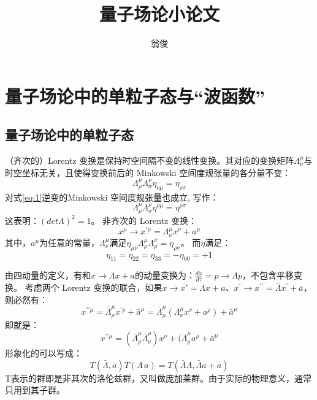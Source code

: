 \documentclass[10pt,a4paper]{article}
\author{翁俊}
\title{量子场论小论文}
\begin{document}
\maketitle
\newpage
\tableofcontents
\newpage

\section{量子场论中的单粒子态与“波函数”}
\label{sec:1}
\subsection{量子场论中的单粒子态}
\label{sec:1.1}
（齐次的）Lorentz 变换是保持时空间隔不变的线性变换。\cite{wenboge}\cite{peskin}其对应的变换矩阵$\Lambda_{\nu}^{\mu}$与时空坐标无关，且使得变换前后的 Minkowski 空间度规张量的各分量不变： 
\begin{equation}
\label{eq:1}
\Lambda_{\rho}^{\mu}\Lambda_{\sigma}^{\nu} \eta_{\nu\mu}=\eta_{\rho\sigma}
\end{equation}
对式\eqref{eq:1}逆变的Minkowski 空间度规张量也成立, 写作：
\begin{equation}
\label{eq:2}
\Lambda_{\rho}^{ \mu}\Lambda_{\sigma}^{\nu} \eta^{\nu\mu}=\eta^{\rho\sigma}
\end{equation}
这表明：$(det\Lambda)^2=1$。
非齐次的 Lorentz 变换：
\begin{equation}
\label{eq:3}
x^{\mu}\rightarrow x^{\prime \mu}=\Lambda_{\nu}^{\mu}x^{\nu}+a^{\mu}
\end{equation}
其中，$a^{\mu}$为任意的常量，$\Lambda_{\nu}^{\mu}$满足$\eta_{\mu\nu}\Lambda_{\rho}^{\mu}\Lambda_{\rho}^{\sigma}=\eta_{\rho\sigma}$。
而$\eta$满足：
\begin{equation}
\label{eq:301}
\eta_{11}=\eta_{22}=\eta_{33}=-\eta_{00}=+1
\end{equation}

由四动量的定义，有和$x\rightarrow \Lambda x+a$的动量变换为：$\frac{dx}{d\tau}=p\rightarrow\Lambda p$，不包含平移变换。
考虑两个 Lorentz 变换的联合，如果$x\rightarrow x\prime=\Lambda x+a$、$x^{\prime}\rightarrow x^{\prime\prime}=\bar{\Lambda }x^{\prime}+\bar{a}$，则必然有：
\begin{equation}
\label{eq:4}
x^{\prime\prime\mu}=\bar{\Lambda}_{\rho}^{\mu}x^{\prime\rho}+\bar{a}^{\mu}=\bar{\Lambda}_{\rho}^{\mu}(\Lambda_{\nu}^{\mu}x^{\nu}+a^{\rho})+\bar{a}^{\mu}
\end{equation}
即就是：
\begin{equation}
\label{eq:5}
x^{\prime\prime\mu}=(\bar{\Lambda}_{\rho}^{\mu}\bar{\Lambda}^{\rho}_{\nu})x^{\nu}+(\bar{\Lambda}_{\rho}^{\mu}a^{\rho}+\bar{a}^{\mu}
\end{equation}
形象化的可以写成：
\begin{equation}
\label{eq:6}
T(\bar{\Lambda},\bar{a})T(\Lambda\,a)=T(\bar{\Lambda}\Lambda,\bar{\Lambda}a+\bar{a})
\end{equation}
T表示的群即是非其次的洛伦兹群，又叫做庞加莱群。由于实际的物理意义，通常只用到其子群。
\end{document}
